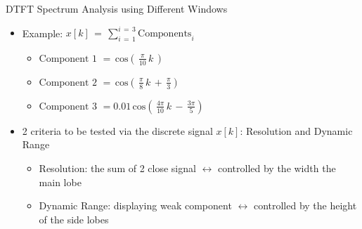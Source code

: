 \documentclass{beamer}
\begin{document}
\begin{frame}[t,allowframebreaks]{DTFT Spectrum Analysis using Different Windows}

\begin{itemize}

\item Example: $x[k] \, = \,\displaystyle\sum_{i \, = \, 1}^{i \, = \, 3} \text{Components}_i$

\begin{itemize}
\item $\text{Component 1 } = \, \text{cos} \left(\, \displaystyle\frac{\pi}{10} \, k \,\right) $
\item $ \text{Component 2 } = \,  \text{cos} \left(\, \displaystyle\frac{\pi}{8} \, k \, + \, \displaystyle\frac{\pi}{3} \right) $
\item $ \text{Component 3 } =  0.01 \, \text{cos} \left(\, \displaystyle\frac{4 \pi}{10} \, k \, - \,\displaystyle\frac{3 \pi }{5} \right) $ 
\end{itemize}


\item 2 criteria to be tested via the discrete signal $x[k]$: Resolution and Dynamic Range

 \begin{itemize}
 \item Resolution: the sum of 2 close signal $\leftrightarrow$ controlled by the width the main lobe
 
 \item Dynamic Range: displaying weak component $\leftrightarrow$ controlled by the height of the side lobes
 \end{itemize}


\end{itemize}

\end{frame}
\end{document}
